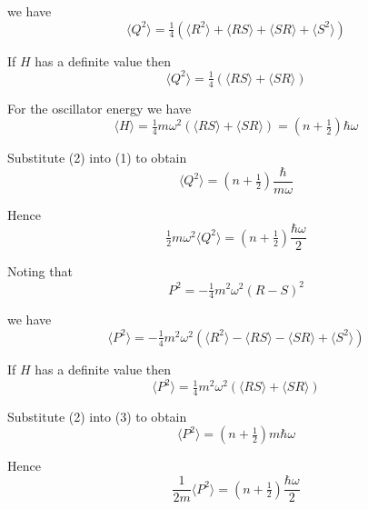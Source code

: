 we have
\begin{equation*}
\langle Q^2\rangle=\tfrac{1}{4}\left(\langle R^2\rangle
+\langle RS\rangle+\langle SR\rangle+\langle S^2\rangle\right)
\end{equation*}

If $H$ has a definite value then
\begin{equation*}
\langle Q^2\rangle=\tfrac{1}{4}\left(\langle RS\rangle+\langle SR\rangle\right)\tag{1}
\end{equation*}

For the oscillator energy we have
\begin{equation*}
\langle H\rangle=\tfrac{1}{4}m\omega^2(\langle RS\rangle+\langle SR\rangle)
=\left(n+\tfrac{1}{2}\right)\hbar\omega
\tag{2}
\end{equation*}

Substitute (2) into (1) to obtain
\begin{equation*}
\langle Q^2\rangle=\left(n+\tfrac{1}{2}\right)\frac{\hbar}{m\omega}
\end{equation*}

Hence
\begin{equation*}
\tfrac{1}{2}m\omega^2\langle Q^2\rangle=\left(n+\tfrac{1}{2}\right)\frac{\hbar\omega}{2}
\end{equation*}

Noting that
\begin{equation*}
P^2=-\tfrac{1}{4}m^2\omega^2(R-S)^2
\end{equation*}

we have
\begin{equation*}
\langle P^2\rangle=-\tfrac{1}{4}m^2\omega^2\left(\langle R^2\rangle
-\langle RS\rangle-\langle SR\rangle
+\langle S^2\rangle\right)
\end{equation*}

If $H$ has a definite value then
\begin{equation*}
\langle P^2\rangle=\tfrac{1}{4}m^2\omega^2(\langle RS\rangle+\langle SR\rangle)\tag{3}
\end{equation*}

Substitute (2) into (3) to obtain
\begin{equation*}
\langle P^2\rangle=\left(n+\tfrac{1}{2}\right)m\hbar\omega
\end{equation*}

Hence
\begin{equation*}
\frac{1}{2m}\langle P^2\rangle=\left(n+\tfrac{1}{2}\right)\frac{\hbar\omega}{2}
\end{equation*}


